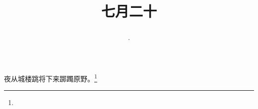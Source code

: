 \title{\date[d=23,m=8,y=2024][year:cn-y,年,month:cn,day:cn,日,·,weekday]·七月二十 }
夜从城楼跳将下来踯躅原野。\footnote{ }

